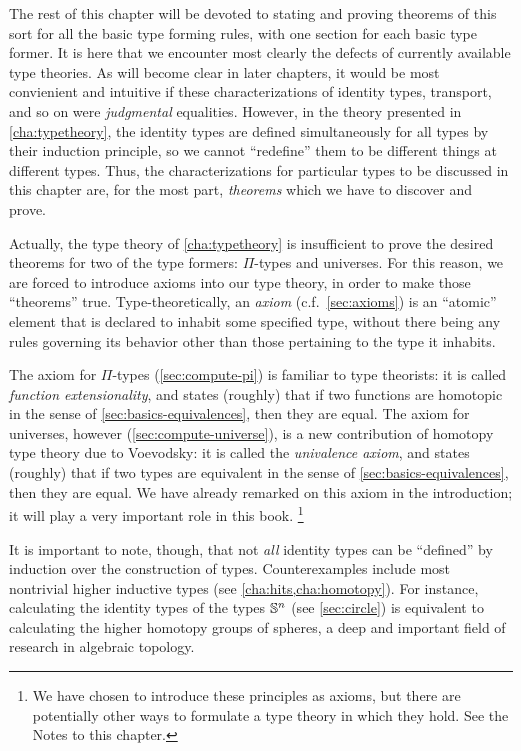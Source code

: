 The rest of this chapter will be devoted to stating and proving theorems of this sort for all the basic type forming rules, with one section for each basic type former.
It is here that we encounter most clearly the defects of currently available type theories.
As will become clear in later chapters, it would be most convienient and intuitive if these characterizations of identity types, transport, and so on were \emph{judgmental} equalities.
However, in the theory presented in \autoref{cha:typetheory}, the identity types are defined simultaneously for all types by their induction principle, so we cannot ``redefine'' them to be different things at different types.
Thus, the characterizations for particular types to be discussed in this chapter are, for the most part, \emph{theorems} which we have to discover and prove.

Actually, the type theory of \autoref{cha:typetheory} is insufficient to prove the desired theorems for two of the type formers: $\Pi$-types and universes.
For this reason, we are forced to introduce axioms into our type theory, in order to make those ``theorems'' true.
Type-theoretically, an \emph{axiom} (c.f.~\autoref{sec:axioms}) is an ``atomic'' element that is declared to inhabit some specified type, without there being any rules governing its behavior other than those pertaining to the type it inhabits.

The axiom for $\Pi$-types (\autoref{sec:compute-pi}) is familiar to type theorists: it is called \emph{function extensionality}, and states (roughly) that if two functions are homotopic in the sense of \autoref{sec:basics-equivalences}, then they are equal.
The axiom for universes, however (\autoref{sec:compute-universe}), is a new contribution of homotopy type theory due to Voevodsky: it is called the \emph{univalence axiom}, and states (roughly) that if two types are equivalent in the sense of \autoref{sec:basics-equivalences}, then they are equal.
We have already remarked on this axiom in the introduction; it will play a very important role in this book.%
\footnote{We have chosen to introduce these principles as axioms, but there are potentially other ways to formulate a type theory in which they hold.
  See the Notes to this chapter.}

It is important to note, though, that not \emph{all} identity types can be ``defined'' by induction over the construction of types.
Counterexamples include most nontrivial higher inductive types (see \autoref{cha:hits,cha:homotopy}).
For instance, calculating the identity types of the types $\mathbb{S}^n$ (see \autoref{sec:circle}) is equivalent to calculating the higher homotopy groups of spheres, a deep and important field of research in algebraic topology.


